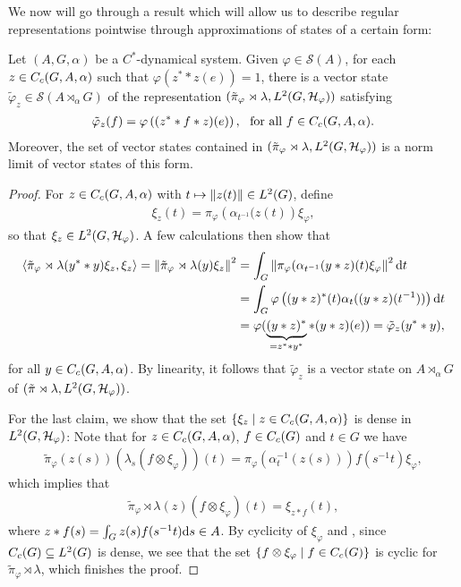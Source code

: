 We now will go through a result which will allow us to describe regular representations pointwise through approximations of states of a certain form:
\begin{proposition}
Let $(A,G,\alpha)$ be a $C^*$-dynamical system. Given $\varphi \in \mathcal{S}(A)$, for each $z \in C_c(G,A,\alpha)$ such that $\varphi(z^* \ast z(e)) = 1$, there is a vector state $\tilde \varphi_z \in \mathcal{S}(A \rtimes_\alpha G)$ of the representation $(\tilde \pi_{\varphi} \rtimes \lambda , L^2(G,\mathcal{H}_\varphi))$ satisfying
\begin{align*}
	\tilde \varphi_z (f) =\varphi\left( (z^* \ast f \ast z)(e) \right), \ \text{ for all } f \in C_c(G,A,\alpha).
\end{align*}
Moreover, the set of vector states contained in $(\tilde \pi_{\varphi} \rtimes \lambda , L^2(G,\mathcal{H}_\varphi))$ is a norm limit of vector states of this form.
\label{mult:vectorstateapprox}
\end{proposition}
\begin{proof}
For $z \in C_c(G,A,\alpha)$ with $t \mapsto \left\lVert z(t) \right\rVert \in L^2(G)$, define
\begin{align*}
	\xi_z(t) = \pi_{\varphi}\left( \alpha_{t^{-1}}(z(t) \right)\xi_\varphi,
\end{align*}
so that $\xi_z \in L^2(G,\mathcal{H}_\varphi)$. A few calculations then show that 
\begin{align*}
	\langle \tilde \pi_\varphi \rtimes \lambda (y^* \ast y) \xi_z , \xi_z \rangle  = \left\lVert \tilde \pi_\varphi \rtimes \lambda(y) \xi_z \right\rVert ^2 &= \int_G \left\lVert  \pi_\varphi ( \alpha_{t^{-1}}(y \ast z)(t) \xi_\varphi \right\rVert^2 \mathrm{d} t \\
	&=\int_G \varphi\left( (y \ast z)^*(t) \alpha_t( (y \ast z)( t^{-1}) ) \right) \mathrm{d} t \\
	&= \varphi ( \underbrace{(y  \ast z )^*}_{= z^* \ast y^*} \ast (y \ast z) (e)) = \tilde\varphi_{z} (y^* \ast y),
\end{align*}
for all $y \in C_c(G,A,\alpha)$. By linearity, it follows that $\tilde \varphi_z$ is a vector state on $A \rtimes_\alpha G$ of $(\tilde \pi \rtimes \lambda, L^2(G,\mathcal{H}_\varphi))$.

For the last claim, we show that the set $\{ \xi_z \mid z \in C_c(G,A,\alpha)\}$ is dense in $L^2(G,\mathcal{H}_\varphi)$: Note that for $z \in C_c(G,A,\alpha)$, $f \in C_c(G)$ and $t \in G$ we have
\begin{align*}
	\tilde \pi_\varphi(z(s)) (\lambda_s (f \otimes \xi_\varphi))(t) = \pi_\varphi(\alpha_t^{-1}(z(s)))f(s^{-1}t) \xi_\varphi,
\end{align*}
which implies that 
\begin{align*}
	\tilde \pi_\varphi \rtimes \lambda (z) (f \otimes \xi_\varphi) (t) = \xi_{z \ast f}(t),
\end{align*}
where $z \ast f(s) = \int_G z(s) f(s^{-1}t) \mathrm{d} s \in A$.  By cyclicity of $\xi_\varphi$ and , since $C_c(G) \subseteq L^2(G)$ is dense, we see that the set $\{ f \otimes \xi_\varphi \mid f \in C_c(G)\}$ is cyclic for $\tilde \pi_\varphi \rtimes \lambda$, which finishes the proof.
\end{proof}


